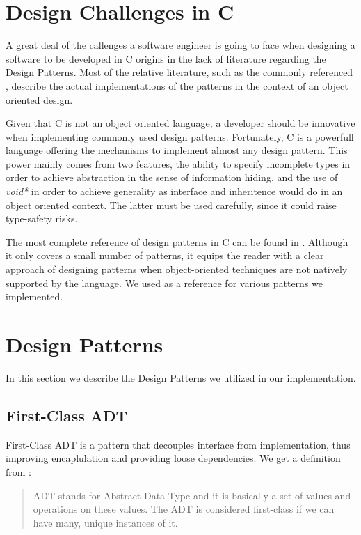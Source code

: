 \section{Design Challenges in C}
A great deal of the callenges a software engineer is going to face when designing a software to be developed in C origins in the lack of literature regarding the Design Patterns. Most of the relative literature, such as the commonly referenced \cite{gofdesignpatterns}, describe the actual implementations of the patterns in the context of an object oriented design.

Given that C is not an object oriented language, a developer should be innovative when implementing commonly used design patterns. Fortunately, C is a powerfull language offering the mechanisms to implement almost any design pattern. This power mainly comes from two features, the ability to specify incomplete types in order to achieve abstraction in the sense of information hiding, and the use of \textit{void*} in order to achieve generality as interface and inheritence would do in an object oriented context. The latter must be used carefully, since it could raise type-safety risks.

The most complete reference of design patterns in C can be found in \cite{patternsinc}. Although it only covers a small number of patterns, it equips the reader with a clear approach of designing patterns when object-oriented techniques are not natively supported by the language. We used \cite{patternsinc} as a reference for various patterns we implemented.


\section{Design Patterns}
In this section we describe the Design Patterns we utilized in our implementation.

\subsection{First-Class ADT}
First-Class ADT is a pattern that decouples interface from implementation, thus improving encaplulation and providing loose dependencies. We get a definition from \cite{patternsinc}:
\begin{quote}
ADT stands for Abstract Data Type and it is basically a set of values and operations on these values. The ADT is considered first-class if we can have many, unique instances of it.
\end{quote}

